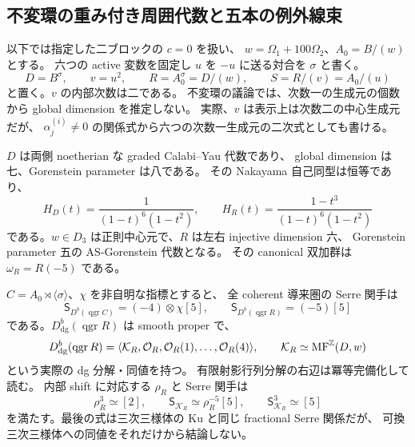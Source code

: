 \subsection{不変環の重み付き周囲代数と五本の例外線束}

以下では指定した二ブロックの $c=0$ を扱い、
$w=\Omega_1+100\Omega_2$、$A_0=B/(w)$ とする。
六つの active 変数を固定し $u$ を $-u$ に送る対合を $\sigma$ と書く。
\[
 D=B^\sigma,\qquad v=u^2,\qquad
 R=A_0^\sigma=D/(w),\qquad S=R/(v)=A_0/(u)
\]
と置く。$v$ の内部次数は二である。
不変環の議論では、次数一の生成元の個数から global dimension を推定しない。
実際、$v$ は表示上は次数二の中心生成元だが、
$\alpha_j^{(i)}\ne0$ の関係式から六つの次数一生成元の二次式としても書ける。

\begin{proposition}[不変環の正則周囲代数と残余圏]
\label{cmo:prop:invariant-weighted-algebra}
$D$ は両側 noetherian な graded Calabi--Yau 代数であり、
global dimension は七、Gorenstein parameter は八である。
その Nakayama 自己同型は恒等であり、
\begin{equation}\label{cmo:eq:invariant-hilbert}
 H_D(t)=\frac{1}{(1-t)^6(1-t^2)},\qquad
 H_R(t)=\frac{1-t^3}{(1-t)^6(1-t^2)}
\end{equation}
である。$w\in D_3$ は正則中心元で、$R$ は左右 injective dimension 六、
Gorenstein parameter 五の AS-Gorenstein 代数となる。
その canonical 双加群は $\omega_R=R(-5)$ である。

$C=A_0\rtimes\langle\sigma\rangle$、$\chi$ を非自明な指標とすると、
全 coherent 導来圏の Serre 関手は
\begin{equation}\label{cmo:eq:invariant-serre}
 \mathsf S_{D^b(\operatorname{qgr}C)}=(-4)\otimes\chi[5],
 \qquad
 \mathsf S_{D^b(\operatorname{qgr}R)}=(-5)[5]
\end{equation}
である。$D^b_{\mathrm{dg}}(\operatorname{qgr}R)$ は smooth proper で、
\begin{equation}\label{cmo:eq:invariant-residual}
 D^b_{\mathrm{dg}}(\operatorname{qgr}R)
 =\langle\mathcal K_R,\mathcal O_R,\mathcal O_R(1),\ldots,\mathcal O_R(4)\rangle,
 \qquad
 \mathcal K_R\simeq\operatorname{MF}^{\mathbb Z}(D,w)
\end{equation}
という実際の dg 分解・同値を持つ。
有限射影行列分解の右辺は冪等完備化して読む。
内部 shift に対応する $\rho_R$ と Serre 関手は
\begin{equation}\label{cmo:eq:invariant-fractional-serre}
 \rho_R^3\simeq[2],\qquad
 \mathsf S_{\mathcal K_R}\simeq\rho_R^{-5}[5],\qquad
 \mathsf S_{\mathcal K_R}^{3}\simeq[5]
\end{equation}
を満たす。最後の式は三次三様体の Ku と同じ fractional Serre 関係だが、
可換三次三様体への同値をそれだけから結論しない。
\end{proposition}

